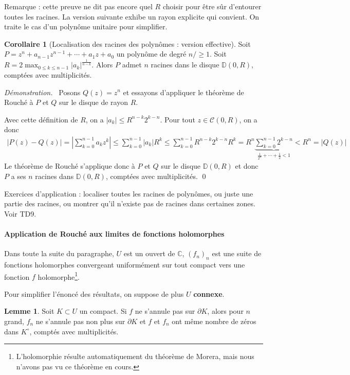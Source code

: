 \documentclass[11pt,a4paper]{book}
\newcommand{\D}{\mathbb{D}}
\newcommand{\C}{\mathbb{C}}
\newcommand\abs[1]{\left|#1\right|}
\theoremstyle{definition}
\newtheorem{corollaire}[theoreme]{Corollaire}
\newtheorem{lemme}[theoreme]{Lemme}
\renewenvironment{proof}{\color{preuve}\emph{Démonstration.~}}{\qed}
\theoremstyle{plain}
\begin{document}
Remarque : cette preuve ne dit pas encore quel $R$ choisir pour être sûr d'entourer toutes les racines. La version suivante exhibe un rayon explicite qui convient. On traite le cas d'un polynôme unitaire pour simplifier.

\begin{corollaire}[Localisation des racines des polynômes : version effective]
Soit $P=z^n + a_{n-1}z^{n-1}+\cdots + a_1z + a_0$ un polynôme de degré $n/\geq 1$.
Soit $R  = 2\max_{0\leq k\leq n-1} |a_k|^{\frac{1}{n-k}}$.
Alors $P$ admet $n$ racines dans le disque $\D(0,R)$, comptées avec multiplicités.
\end{corollaire}
\begin{proof}
Posons $Q(z)=z^n$ et essayons d'appliquer le théorème de Rouché à $P$ et $Q$ sur le disque de rayon $R$.

Avec cette définition de $R$, on a $|a_k| \leq R^{n-k}2^{k-n}$.
Pour tout $z\in \mathcal C(0,R)$, on a donc
\begin{align*}
\abs{P(z)-Q(z)} 
=  \abs{\sum_{k=0}^{n-1}a_kz^k}
\leq \sum_{k=0}^{n-1} \abs{a_k}R^k
\leq \sum_{k=0}^{n-1} R^{n-k}2^{k-n}R^k
= R^n \underbrace{\sum_{k=0}^{n-1} 2^{k-n}}_{\frac{1}{2^n}+\cdots +\frac{1}{2} < 1}
\boxed{<R^n =  \abs{Q(z)} }
\end{align*}
Le théorème de Rouché s'applique donc à $P$ et $Q$ sur le disque $\D(0,R)$ et donc $P$ a ses $n$ racines dans $\D(0,R)$, comptées avec multiplicités.
\end{proof}

Exercices d'application : localiser toutes les racines de polynômes, ou juste une partie des racines, ou montrer qu'il n'existe pas de racines dans certaines zones. Voir TD9.

\paragraph{Application de Rouché aux limites de fonctions holomorphes}

Dans toute la suite du paragraphe, $U$ est un ouvert de $\C$, $(f_n)_n$ est une suite de fonctions holomorphes convergeant uniformément sur tout compact vers une fonction $f$ holomorphe\footnote{L'holomorphie résulte automatiquement du théorème de Morera, mais nous n'avons pas vu ce théorème en cours.}.

Pour simplifier l'énoncé des résultats, on suppose de plus $U$ \textbf{connexe}.

\begin{lemme}
Soit $K \subset U$ un compact. Si $f$ ne s'annule pas sur $\partial K$, alors pour $n$ grand, $f_n$ ne s'annule pas non plus sur $\partial K$ et $f$ et $f_n$ ont même nombre de zéros dans $K^\circ$, comptés avec multiplicités.
\end{lemme}
\end{document}
